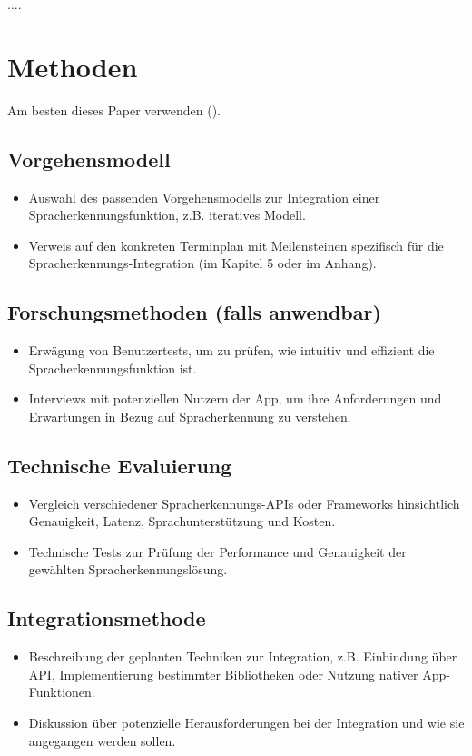 \documentclass[11pt,a4paper]{article}
\begin{document}
....

\newpage \section{Methoden}
Am besten dieses Paper verwenden (\cite{choi2018tutorial}).

\subsection{Vorgehensmodell}
\begin{itemize}
    \item Auswahl des passenden Vorgehensmodells zur Integration einer Spracherkennungsfunktion, z.B. iteratives Modell.
    \item Verweis auf den konkreten Terminplan mit Meilensteinen spezifisch für die Spracherkennungs-Integration (im Kapitel 5 oder im Anhang).
\end{itemize}

\subsection{Forschungsmethoden (falls anwendbar)}
\begin{itemize}
    \item Erwägung von Benutzertests, um zu prüfen, wie intuitiv und effizient die Spracherkennungsfunktion ist.
    \item Interviews mit potenziellen Nutzern der App, um ihre Anforderungen und Erwartungen in Bezug auf Spracherkennung zu verstehen.
\end{itemize}

\subsection{Technische Evaluierung}
\begin{itemize}
    \item Vergleich verschiedener Spracherkennungs-APIs oder Frameworks hinsichtlich Genauigkeit, Latenz, Sprachunterstützung und Kosten.
    \item Technische Tests zur Prüfung der Performance und Genauigkeit der gewählten Spracherkennungslösung.
\end{itemize}

\subsection{Integrationsmethode}
\begin{itemize}
    \item Beschreibung der geplanten Techniken zur Integration, z.B. Einbindung über API, Implementierung bestimmter Bibliotheken oder Nutzung nativer App-Funktionen.
    \item Diskussion über potenzielle Herausforderungen bei der Integration und wie sie angegangen werden sollen.
\end{itemize}
\end{document}
